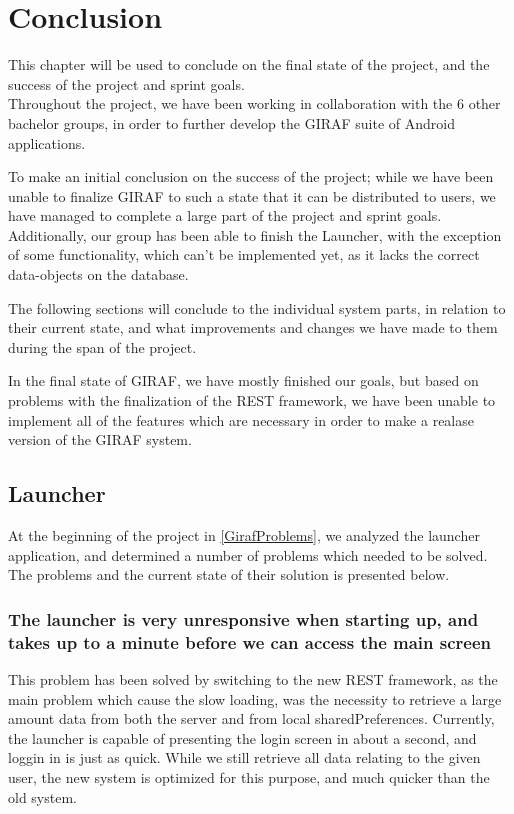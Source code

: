 \chapter{Conclusion}
This chapter will be used to conclude on the final state of the project, and the
success of the project and sprint goals. \\
Throughout the project, we have been working in collaboration with the 6 other
bachelor groups, in order to further develop the GIRAF suite of Android
applications.\nl

To make an initial conclusion on the success of the project; while we have been
unable to finalize GIRAF to such a state that it can be distributed to users, we
have managed to complete a large part of the project and sprint goals.
Additionally, our group has been able to finish the Launcher, with the exception
of some functionality, which can't be implemented yet, as it lacks the correct
data-objects on the database.\nl

The following sections will conclude to the individual system parts, in relation
to their current state, and what improvements and changes we have made to them
during the span of the project.\nl

In the final state of GIRAF, we have mostly finished our goals, but based on
problems with the finalization of the REST framework, we have been unable to
implement all of the features which are necessary in order to make a realase
version of the GIRAF system.

\section{Launcher}
At the beginning of the project in \autoref{GirafProblems}, we analyzed the
launcher application, and determined a number of problems which needed to be
solved. The problems and the current state of their solution is presented
below.

\subsection*{The launcher is very unresponsive when starting up, and takes up to
a minute before we can access the main screen}
 This problem has been solved by
switching to the new REST framework, as the main problem which cause the slow
loading, was the necessity to retrieve a large amount data from both the server
and from local sharedPreferences. Currently, the launcher is capable of
presenting the login screen in about a second, and loggin in is just as quick.
While we still retrieve all data relating to the given user, the new system is
optimized for this purpose, and much quicker than the old system.

